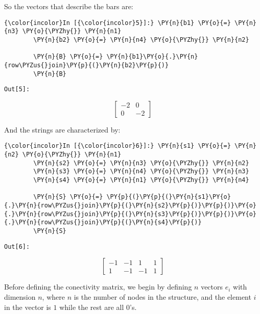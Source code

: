     So the vectors that describe the bars are:

    \begin{Verbatim}[commandchars=\\\{\}]
{\color{incolor}In [{\color{incolor}5}]:} \PY{n}{b1} \PY{o}{=} \PY{n}{n3} \PY{o}{\PYZhy{}} \PY{n}{n1}
        \PY{n}{b2} \PY{o}{=} \PY{n}{n4} \PY{o}{\PYZhy{}} \PY{n}{n2}

        \PY{n}{B} \PY{o}{=} \PY{n}{b1}\PY{o}{.}\PY{n}{row\PYZus{}join}\PY{p}{(}\PY{n}{b2}\PY{p}{)}
        \PY{n}{B}
\end{Verbatim}
\texttt{\color{outcolor}Out[{\color{outcolor}5}]:}


        \begin{equation*}
        \left[\begin{matrix}-2 & 0\\0 & -2\end{matrix}\right]
        \end{equation*}



    And the strings are characterized by:

    \begin{Verbatim}[commandchars=\\\{\}]
{\color{incolor}In [{\color{incolor}6}]:} \PY{n}{s1} \PY{o}{=} \PY{n}{n2} \PY{o}{\PYZhy{}} \PY{n}{n1}
        \PY{n}{s2} \PY{o}{=} \PY{n}{n3} \PY{o}{\PYZhy{}} \PY{n}{n2}
        \PY{n}{s3} \PY{o}{=} \PY{n}{n4} \PY{o}{\PYZhy{}} \PY{n}{n3}
        \PY{n}{s4} \PY{o}{=} \PY{n}{n1} \PY{o}{\PYZhy{}} \PY{n}{n4}

        \PY{n}{S} \PY{o}{=} \PY{p}{(}\PY{p}{(}\PY{n}{s1}\PY{o}{.}\PY{n}{row\PYZus{}join}\PY{p}{(}\PY{n}{s2}\PY{p}{)}\PY{p}{)}\PY{o}{.}\PY{n}{row\PYZus{}join}\PY{p}{(}\PY{n}{s3}\PY{p}{)}\PY{p}{)}\PY{o}{.}\PY{n}{row\PYZus{}join}\PY{p}{(}\PY{n}{s4}\PY{p}{)}
        \PY{n}{S}
\end{Verbatim}
\texttt{\color{outcolor}Out[{\color{outcolor}6}]:}


        \begin{equation*}
        \left[\begin{matrix}-1 & -1 & 1 & 1\\1 & -1 & -1 & 1\end{matrix}\right]
        \end{equation*}



    Before defining the conectivity matrix, we begin by defining \(n\)
vectors \(e_i\) with dimension \(n\), where \(n\) is the number of nodes
in the structure, and the element \(i\) in the vector is \(1\) while the
rest are all \(0\)'s.

